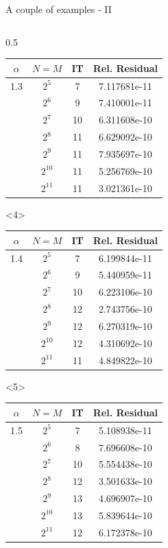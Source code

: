 \documentclass[aspectratio=169,xcolor=dvipsnames]{beamer}
\begin{document}
\begin{frame}[fragile]{A couple of examples - II}
\begin{columns}
\begin{column}{0.5\columnwidth}
\begin{onlyenv}
			\begin{tabular}{cccc}
				\toprule
				$\alpha$ & $N = M$ & IT & Rel. Residual \\
				\midrule
 1.3 & $2^{5}$ & 7 & 7.117681e-11 \\
& $2^{6}$ & 9 & 7.410001e-11 \\
& $2^{7}$ & 10 & 6.311608e-10 \\
& $2^{8}$ & 11 & 6.629092e-10 \\
& $2^{9}$ & 11 & 7.935697e-10 \\
& $2^{10}$ & 11 & 5.256769e-10 \\
& $2^{11}$ & 11 & 3.021361e-10 \\
				\bottomrule
			\end{tabular}
			
		\end{onlyenv}
		\begin{onlyenv}<4>
			\centering
			
			\begin{tabular}{cccc}
				\toprule
				$\alpha$ & $N = M$ & IT & Rel. Residual \\
				\midrule
 1.4 & $2^{5}$ & 7 & 6.199844e-11 \\
& $2^{6}$ & 9 & 5.440959e-11 \\
& $2^{7}$ & 10 & 6.223106e-10 \\
& $2^{8}$ & 12 & 2.743756e-10 \\
& $2^{9}$ & 12 & 6.270319e-10 \\
& $2^{10}$ & 12 & 4.310692e-10 \\
& $2^{11}$ & 11 & 4.849822e-10 \\
				\bottomrule
			\end{tabular}
			
		\end{onlyenv}
		\begin{onlyenv}<5>
			\centering
			
			\begin{tabular}{cccc}
				\toprule
				$\alpha$ & $N = M$ & IT & Rel. Residual \\
				\midrule
 1.5 & $2^{5}$ & 7 & 5.108938e-11 \\
& $2^{6}$ & 8 & 7.696608e-10 \\
& $2^{7}$ & 10 & 5.554438e-10 \\
& $2^{8}$ & 12 & 3.501633e-10 \\
& $2^{9}$ & 13 & 4.696907e-10 \\
& $2^{10}$ & 13 & 5.839644e-10 \\
& $2^{11}$ & 12 & 6.172378e-10 \\
				\bottomrule
			\end{tabular}
			

\end{onlyenv}
\end{column}
\end{columns}
\end{frame}
\end{document}
